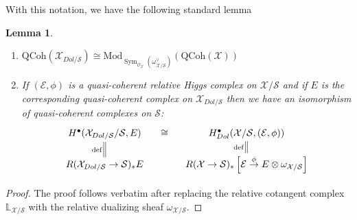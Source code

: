 \documentclass[11pt]{amsart}
\newcommand  {\Mod}   {\mathrm{Mod}}
\newcommand  {\QCoh}   {\mathrm{QCoh}}
\DeclareMathOperator{\Sym}{Sym}
\theoremstyle{plain}
\numberwithin{equation}{section}
\theoremstyle{definition}
\newtheorem{Def}{Definition}[section]
\theoremstyle{plain}
\newtheorem{Lem}[Def]{Lemma}
\begin{document}
\smallskip

\smallskip

\noindent
With this notation, we have the following standard lemma


\smallskip

\begin{Lem}\label{Corr1}
\begin{enumerate}
\item $\QCoh(\mathcal X_{Dol/\mathcal{S}})\cong \Mod_{\Sym_{\mathcal O_{\mathcal X}} (\omega^{\vee}_{\mathcal X/\mathcal S})} (\QCoh(\mathcal{X})) $
\item If $(\mathcal{E},\phi)$ is a quasi-coherent relative Higgs complex on $\mathcal{X}/\mathcal{S}$ and if $E$ is the corresponding quasi-coherent complex on $\mathcal{X}_{Dol/\mathcal{S}}$ then we have an isomorphism of quasi-coherent complexes on $\mathcal{S}$: 
\[
\xymatrix@R-1pc@C-1pc{
H^{\bullet}(\mathcal X_{Dol/\mathcal{S}}/\mathcal{S}, E) \ar@{=}[d]_-{\text{def}} & \cong & H^{\bullet}_{Dol}(\mathcal X/\mathcal{S}, (\mathcal E,\phi)) \ar@{=}[d]_-{\text{def}} \\
R(\mathcal X_{{Dol}/\mathcal{S}} \to \mathcal{S})_{*} E 
& & R(\mathcal{X} \to \mathcal{S})_{*} \left[  \mathcal{E} \stackrel{\phi}{\to} E\otimes \omega_{\mathcal{X}/\mathcal{S}} \right]
}
\]
\end{enumerate}
\end{Lem}
\begin{proof}
The proof follows verbatim \cite[Proposition 5.1.2]{PS} after replacing the relative cotangent complex $\mathbb L_{\mathcal X/\mathcal S}$ with the relative dualizing sheaf $\omega_{\mathcal X/\mathcal S}$.
\end{proof}

\smallskip
\end{document}
